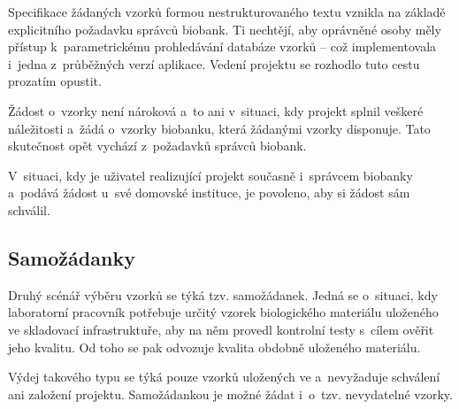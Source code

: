 \documentclass[11pt, final, oneside]{fithesis2}
\begin{document}
Specifikace žádaných vzorků formou nestrukturovaného textu vznikla na základě explicitního požadavku správců biobank. Ti nechtějí, aby oprávněné osoby měly přístup k~parametrickému prohledávání databáze vzorků -- což implementovala i~jedna z~průběžných verzí aplikace. Vedení projektu se rozhodlo tuto cestu prozatím opustit.

Žádost o~vzorky není nároková a~to ani v~situaci, kdy projekt splnil veškeré náležitosti a~žádá o~vzorky biobanku, která žádanými vzorky disponuje. Tato skutečnost opět vychází z~požadavků správců biobank.

V~situaci, kdy je uživatel realizující projekt současně i~správcem biobanky a~podává žádost u~své domovské instituce, je povoleno, aby si žádost sám schválil.

\subsection{Samožádanky}
Druhý scénář výběru vzorků se týká tzv. samožádanek. Jedná se o~situaci, kdy laboratorní pracovník potřebuje určitý vzorek biologického materiálu uloženého ve skladovací infrastruktuře, aby na něm provedl kontrolní testy s~cílem ověřit jeho kvalitu. Od toho se pak odvozuje kvalita obdobně uloženého materiálu. 

Výdej takového typu se týká pouze vzorků uložených ve  a~nevyžaduje schválení ani založení projektu. Samožádankou je možné žádat i~o~tzv. nevydatelné vzorky. 
\end{document}

